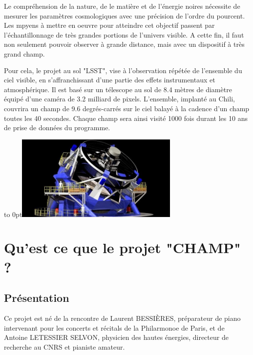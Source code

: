 \documentclass[french,a4paper,12pt]{report}
\begin{document}
\begin{itemize}
  Le compréhension de la nature, de le matière et de l'énergie noires nécessite de mesurer les paramètres cosmologiques avec une précision de l'ordre du pourcent. Les mpyens à mettre en oeuvre pour atteindre cet objectif passent par l'échantillonnage de très grandes portions de l'univers visible. A cette fin, il faut non seulement pouvoir observer à grande distance, mais avec un dispositif à très grand champ.
  
  Pour cela, le projet au sol "LSST", vise à l'observation répétée de l'ensemble du ciel visible, en s'affranchissant d'une partie des effets instrumentaux et atmosphérique. Il est basé sur un télescope au sol de 8.4 mètres de diamètre équipé d'une caméra de 3.2 milliard de pixels. L'ensemble, implanté au Chili, couvrira un champ de 9.6 degrés-carrés sur le ciel balayé à la cadence d'un champ toutes les 40 secondes. Chaque champ sera ainsi visité 1000 fois durant les 10 ans de prise de données du programme.\newline
    	
  	\hfill\hbox to 0pt{\hss\includegraphics[width=8cm]{lsst.jpg}\hss}\hfill\null
  \end{itemize}
  
    
%
%
\part{Qu'est ce que le projet "CHAMP" ?}
  \chapter{Présentation}
  
  Ce projet est né de la rencontre de Laurent BESSIÈRES, préparateur de piano intervenant pour les concerts et récitals de la Philarmonoe de Paris, et de Antoine LETESSIER SELVON, physicien des hautes énergies, directeur de recherche au CNRS et pianiste amateur. 
  
\end{document}
